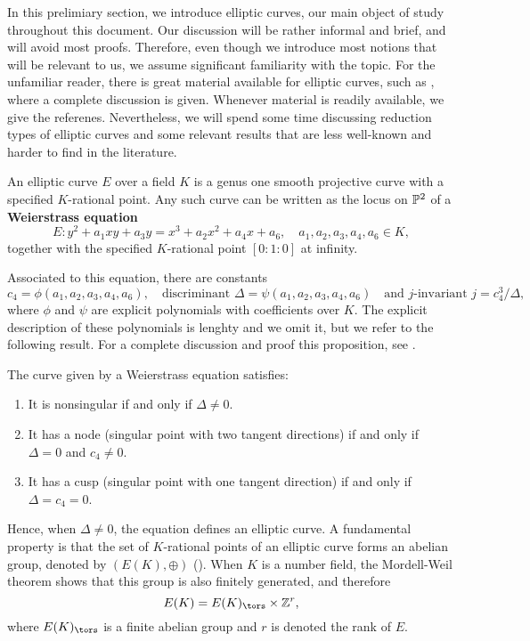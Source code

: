 
In this prelimiary section, we introduce elliptic curves, our main object of study throughout this document. Our discussion will be rather informal and brief, and will avoid most proofs. Therefore, even though we introduce most notions that will be relevant to us, we assume significant familiarity with the topic. For the unfamiliar reader, there is great material available for elliptic curves, such as \cite{S1}, where a complete discussion is given. Whenever material is readily available, we give the referenes. Nevertheless, we will spend some time discussing reduction types of elliptic curves and some relevant results that are less well-known and harder to find in the literature. 

An elliptic curve $E$ over a field $K$ is a genus one smooth projective curve with a specified $K$-rational point. Any such curve can be written as the locus on $\mathbb{P}^2$ of a \textbf{Weierstrass equation}
\begin{equation}\label{eqn_gen_elliptic}
    E: y^2+a_1xy+a_3y=x^3+a_2x^2+a_4x+a_6,\quad a_1,a_2,a_3,a_4,a_6\in K,
\end{equation}
together with the specified $K$-rational point $[0:1:0]$ at infinity.

Associated to this equation, there are constants
$$c_4=\phi(a_1,a_2,a_3,a_4,a_6),\quad\text{discriminant } \Delta=\psi(a_1,a_2,a_3,a_4,a_6)\quad \text{and $j$-invariant }j=c_4^3/\Delta,$$
where $\phi$ and $\psi$ are explicit polynomials with coefficients over $K$. 
The explicit description of these polynomials is lenghty and we omit it, but we refer to the following result. For a complete discussion and proof this proposition, see \cite[\S III.1]{S1}.

\begin{prop}\label{prop_nodecusp}
    The curve given by a Weierstrass equation satisfies:
    \begin{enumerate}
        \item It is nonsingular if and only if $\Delta\neq0$.
        \item It has a node (singular point with two tangent directions) if and only if $\Delta=0$ and $c_4 \neq 0$.
        \item It has a cusp (singular point with one tangent direction) if and only if $\Delta= c_4 = 0$. 
    \end{enumerate}
\end{prop}

Hence, when $\Delta\neq0$, the equation defines an elliptic curve. A fundamental property is that the set of $K$-rational points of an elliptic curve forms an abelian group, denoted by $(E(K),\oplus)$ (\cite[\S III.2]{S1}). When $K$ is a number field, the Mordell-Weil theorem shows that this group is also finitely generated, and therefore 
$$E(K)=E(K)_{\tors}\times\ZZ^r,$$
where $E(K)_{\tors}$ is a finite abelian group and $r$ is denoted the rank of $E$.
